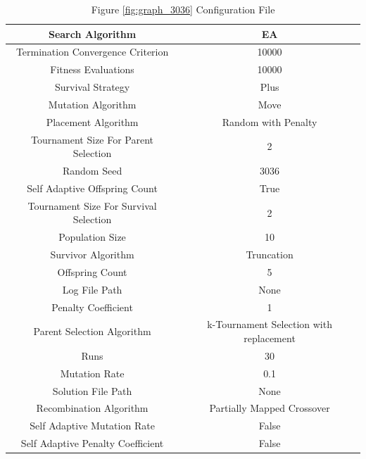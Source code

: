 \documentclass{standalone}
\begin{document}
\begin{table}[!htb]
	\centering
	\caption{Figure \ref{fig:graph_3036} Configuration File}
	\label{tab:graph_3036}
	\begin{tabular}{| c | c |}
		\hline
		Search Algorithm		& EA		 \\
		\hline
		Termination Convergence Criterion		& 10000		 \\
		\hline
		Fitness Evaluations		& 10000		 \\
		\hline
		Survival Strategy		& Plus		 \\
		\hline
		Mutation Algorithm		& Move		 \\
		\hline
		Placement Algorithm		& Random with Penalty		 \\
		\hline
		Tournament Size For Parent Selection		& 2		 \\
		\hline
		Random Seed		& 3036		 \\
		\hline
		Self Adaptive Offspring Count		& True		 \\
		\hline
		Tournament Size For Survival Selection		& 2		 \\
		\hline
		Population Size		& 10		 \\
		\hline
		Survivor Algorithm		& Truncation		 \\
		\hline
		Offspring Count		& 5		 \\
		\hline
		Log File Path		& None		 \\
		\hline
		Penalty Coefficient		& 1		 \\
		\hline
		Parent Selection Algorithm		& k-Tournament Selection with replacement		 \\
		\hline
		Runs		& 30		 \\
		\hline
		Mutation Rate		& 0.1		 \\
		\hline
		Solution File Path		& None		 \\
		\hline
		Recombination Algorithm		& Partially Mapped Crossover		 \\
		\hline
		Self Adaptive Mutation Rate		& False		 \\
		\hline
		Self Adaptive Penalty Coefficient		& False		 \\
		\hline
	\end{tabular}
\end{table}
\end{document}
